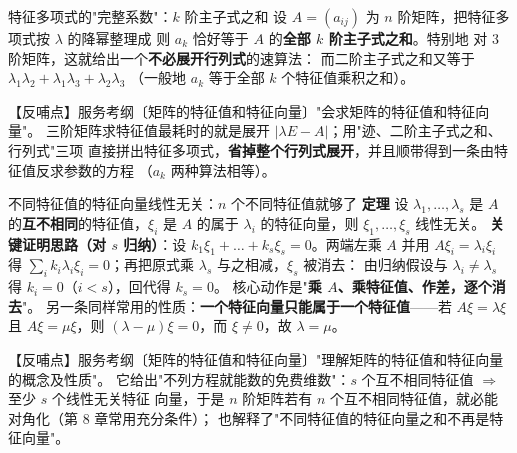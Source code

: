 
\begin{fdeep}{特征多项式的"完整系数"：$k$ 阶主子式之和}
设 $A=(a_{ij})$ 为 $n$ 阶矩阵，把特征多项式按 $\lambda$ 的降幂整理成
则 $a_k$ 恰好等于 $A$ 的\textbf{全部 $k$ 阶主子式之和}。特别地
对 $3$ 阶矩阵，这就给出一个\textbf{不必展开行列式}的速算法：
而二阶主子式之和又等于 $\lambda_1\lambda_2+\lambda_1\lambda_3+\lambda_2\lambda_3$
（一般地 $a_k$ 等于全部 $k$ 个特征值乘积之和）。

【反哺点】服务考纲〔矩阵的特征值和特征向量〕"会求矩阵的特征值和特征向量"。
三阶矩阵求特征值最耗时的就是展开 $|\lambda E-A|$；用"迹、二阶主子式之和、行列式"三项
直接拼出特征多项式，\textbf{省掉整个行列式展开}，并且顺带得到一条由特征值反求参数的方程
（$a_k$ 两种算法相等）。
\end{fdeep}

\begin{fdeep}{不同特征值的特征向量线性无关：$n$ 个不同特征值就够了}
\textbf{定理} 设 $\lambda_1,\dots,\lambda_s$ 是 $A$ 的\textbf{互不相同}的特征值，$\xi_i$ 是 $A$ 的属于
$\lambda_i$ 的特征向量，则 $\xi_1,\dots,\xi_s$ 线性无关。
\textbf{关键证明思路（对 $s$ 归纳）}：设 $k_1\xi_1+\dots+k_s\xi_s=0$。两端左乘 $A$ 并用 $A\xi_i=\lambda_i\xi_i$ 得
$\sum_ik_i\lambda_i\xi_i=0$；再把原式乘 $\lambda_s$ 与之相减，$\xi_s$ 被消去：
由归纳假设与 $\lambda_i\ne\lambda_s$ 得 $k_i=0$（$i<s$），回代得 $k_s=0$。
核心动作是"\textbf{乘 $A$、乘特征值、作差，逐个消去}"。
另一条同样常用的性质：\textbf{一个特征向量只能属于一个特征值}——若 $A\xi=\lambda\xi$ 且
$A\xi=\mu\xi$，则 $(\lambda-\mu)\xi=0$，而 $\xi\ne0$，故 $\lambda=\mu$。

【反哺点】服务考纲〔矩阵的特征值和特征向量〕"理解矩阵的特征值和特征向量的概念及性质"。
它给出"不列方程就能数的免费维数"：$s$ 个互不相同特征值 $\Rightarrow$ 至少 $s$ 个线性无关特征
向量，于是 $n$ 阶矩阵若有 $n$ 个互不相同特征值，就必能对角化（第 8 章常用充分条件）；
也解释了"不同特征值的特征向量之和不再是特征向量"。
\end{fdeep}

